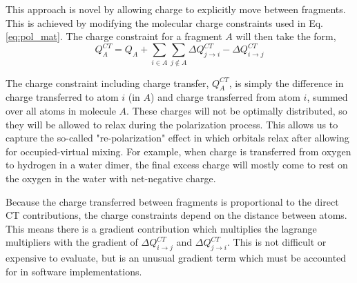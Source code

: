 \documentclass[journal=jctcce,manuscript=article]{achemso}
\begin{document}
This approach is novel by allowing charge to explicitly move between fragments. This is achieved by modifying the molecular charge constraints used in Eq. \ref{eq:pol_mat}. The charge constraint for a fragment $A$ will then take the form,
\begin{equation}
  Q^{CT}_A=Q_A+\sum_{i\in A}\sum_{j\notin A}\Delta Q^{CT}_{j\rightarrow i}-\Delta Q^{CT}_{i\rightarrow j}
  \label{eq:charge_constraint}
\end{equation}

The charge constraint including charge transfer, $Q^{CT}_A$, is simply the
difference in charge transferred to atom $i$ (in $A$) and charge transferred from atom
$i$, summed over all atoms in molecule $A$. These charges will not be optimally
distributed, so they will be allowed to relax during the polarization process.
This allows us to capture the so-called "re-polarization"\cite{khaliullin2007unravelling}
effect in which orbitals relax after allowing for occupied-virtual mixing.
For example, when charge is transferred from oxygen to hydrogen in a water
dimer, the final excess charge will mostly come to rest on the oxygen in
the water with net-negative charge.

Because the
charge transferred between fragments is proportional to the direct CT contributions,
the charge constraints depend on the distance between atoms. This means there
is a gradient contribution which multiplies the lagrange multipliers
with the gradient of $\Delta Q^{CT}_{i\rightarrow j}$ and $\Delta Q^{CT}_{j\rightarrow i}$.
This is not difficult or expensive to evaluate, but is an 
unusual gradient term which must be accounted for in software implementations.
\end{document}
